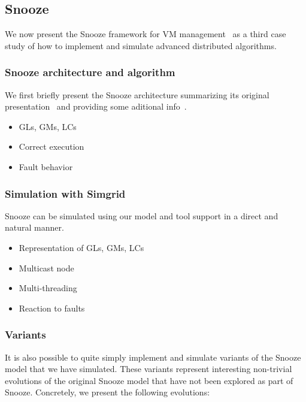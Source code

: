 \subsection{Snooze}
\label{subsec:snooze}


We now present the Snooze framework for VM
management~\cite{feller:ccgrid12} as a third case study of how
to implement and simulate advanced distributed algorithms.

\subsubsection{Snooze architecture and  algorithm}

We first briefly present the Snooze architecture summarizing its
original presentation~\cite{feller:ccgrid12} and providing some
aditional info~\cite{snoozedev14}.

\begin{itemize}
  \item GLs, GMs, LCs
  \item Correct execution
  \item Fault behavior
\end{itemize}

\subsubsection{Simulation with Simgrid}

Snooze can be simulated using our model and tool support in a direct
and natural manner.

\begin{itemize}
  \item Representation of GLs, GMs, LCs
  \item Multicast node
  \item Multi-threading
  \item Reaction to faults
\end{itemize}

\subsubsection{Variants}

It is also possible to quite simply implement and simulate variants of
the Snooze model that we have simulated. These variants represent
interesting non-trivial evolutions of the original Snooze model that
have not been explored as part of Snooze. Concretely, we present the
following evolutions:

